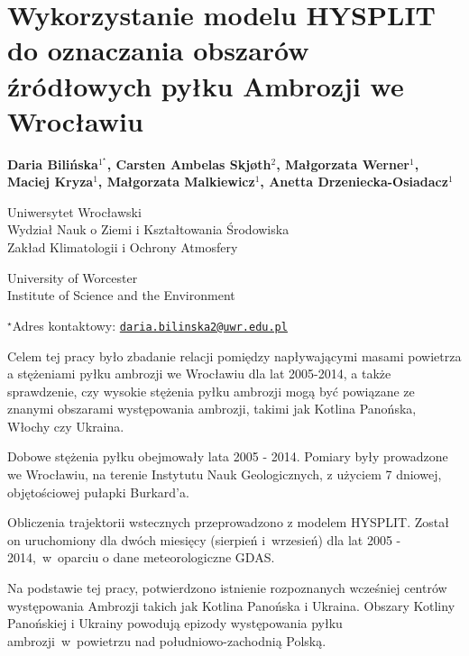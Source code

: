 \documentclass[\main/boa.tex]{subfiles}
\begin{document}
\sloppy
\section{Wykorzystanie modelu HYSPLIT do oznaczania obszarów źródłowych pyłku Ambrozji we Wrocławiu}

\begin{center}
  {\bf {} Daria Bilińska$^{1^\star}$,  Carsten Ambelas Skjøth$^{2}$,  Małgorzata Werner$^{1}$,  Maciej Kryza$^{1}$,  Małgorzata Malkiewicz$^{1}$,  Anetta Drzeniecka-Osiadacz$^{1}$}
\end{center}

\vskip 0.3cm

\begin{affiliations}
\begin{enumerate}
\begin{minipage}{0.915\textwidth}
\centering
\item Uniwersytet Wrocławski\\ Wydział Nauk o Ziemi i Kształtowania Środowiska\\Zakład Klimatologii i Ochrony Atmosfery\\[-2pt]
\item University of Worcester\\ Institute of Science and the Environment\\[-2pt]
\end{minipage}
\end{enumerate}
$^\star$Adres kontaktowy: \href{mailto:daria.bilinska2@uwr.edu.pl}{\nolinkurl{daria.bilinska2@uwr.edu.pl}}\\
\end{affiliations}

\vskip 0.5cm


\vskip 0.5cm

Celem tej pracy było zbadanie relacji pomiędzy napływającymi masami powietrza a stężeniami pyłku ambrozji we Wrocławiu dla lat 2005-2014, a także sprawdzenie, czy wysokie stężenia pyłku ambrozji mogą być powiązane ze znanymi obszarami występowania ambrozji, takimi jak Kotlina Panońska, Włochy czy Ukraina.


Dobowe stężenia pyłku obejmowały lata 2005 - 2014. Pomiary były prowadzone we Wrocławiu, na terenie Instytutu Nauk Geologicznych, z użyciem 7 dniowej, objętościowej pułapki Burkard’a. 


Obliczenia trajektorii wstecznych przeprowadzono z modelem HYSPLIT. Został on uruchomiony dla dwóch miesięcy (sierpień i wrzesień) dla lat 2005 - 2014,~w~oparciu o dane meteorologiczne GDAS.


Na podstawie tej pracy, potwierdzono istnienie rozpoznanych wcześniej centrów występowania Ambrozji takich jak Kotlina Panońska i Ukraina. Obszary Kotliny Panońskiej i Ukrainy powodują epizody występowania pyłku ambrozji~w~powietrzu nad południowo-zachodnią Polską.
\end{document}
